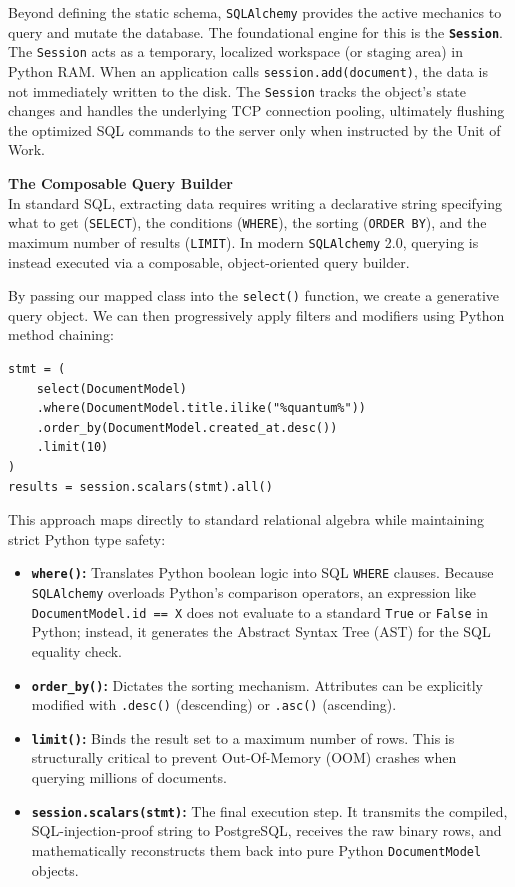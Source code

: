 Beyond defining the static schema, \texttt{SQLAlchemy} provides the active mechanics to query and mutate the database. The foundational engine for this is the \textbf{\texttt{Session}}. The \texttt{Session} acts as a temporary, localized workspace (or staging area) in Python RAM. When an application calls \texttt{session.add(document)}, the data is not immediately written to the disk. The \texttt{Session} tracks the object's state changes and handles the underlying TCP connection pooling, ultimately flushing the optimized SQL commands to the server only when instructed by the Unit of Work.

\textbf{The Composable Query Builder} \\
In standard SQL, extracting data requires writing a declarative string specifying what to get (\texttt{SELECT}), the conditions (\texttt{WHERE}), the sorting (\texttt{ORDER BY}), and the maximum number of results (\texttt{LIMIT}). In modern \texttt{SQLAlchemy} 2.0, querying is instead executed via a composable, object-oriented query builder.

By passing our mapped class into the \texttt{select()} function, we create a generative query object. We can then progressively apply filters and modifiers using Python method chaining:

\begin{lstlisting}[caption={Composable SQL in Python}]
stmt = (
    select(DocumentModel)
    .where(DocumentModel.title.ilike("%quantum%"))
    .order_by(DocumentModel.created_at.desc())
    .limit(10)
)
results = session.scalars(stmt).all()
\end{lstlisting}

This approach maps directly to standard relational algebra while maintaining strict Python type safety:
\begin{itemize}
    \item \textbf{\texttt{where()}:} Translates Python boolean logic into SQL \texttt{WHERE} clauses. Because \texttt{SQLAlchemy} overloads Python's comparison operators, an expression like \texttt{DocumentModel.id == X} does not evaluate to a standard \texttt{True} or \texttt{False} in Python; instead, it generates the Abstract Syntax Tree (AST) for the SQL equality check.
    \item \textbf{\texttt{order\_by()}:} Dictates the sorting mechanism. Attributes can be explicitly modified with \texttt{.desc()} (descending) or \texttt{.asc()} (ascending).
    \item \textbf{\texttt{limit()}:} Binds the result set to a maximum number of rows. This is structurally critical to prevent Out-Of-Memory (OOM) crashes when querying millions of documents.
    \item \textbf{\texttt{session.scalars(stmt)}:} The final execution step. It transmits the compiled, SQL-injection-proof string to PostgreSQL, receives the raw binary rows, and mathematically reconstructs them back into pure Python \texttt{DocumentModel} objects.
\end{itemize}

